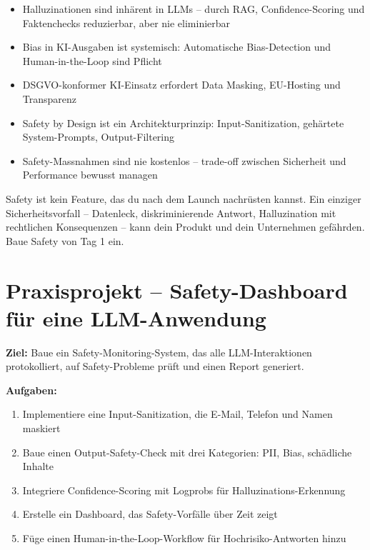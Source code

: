 \begin{zusammenfassung}
\begin{itemize}[leftmargin=*]
    \item Halluzinationen sind inhärent in LLMs -- durch RAG, Confidence-Scoring und Faktenchecks reduzierbar, aber nie eliminierbar
    \item Bias in KI-Ausgaben ist systemisch: Automatische Bias-Detection und Human-in-the-Loop sind Pflicht
    \item DSGVO-konformer KI-Einsatz erfordert Data Masking, EU-Hosting und Transparenz
    \item Safety by Design ist ein Architekturprinzip: Input-Sanitization, gehärtete System-Prompts, Output-Filtering
    \item Safety-Massnahmen sind nie kostenlos -- trade-off zwischen Sicherheit und Performance bewusst managen
\end{itemize}
\end{zusammenfassung}

\begin{merke}
Safety ist kein Feature, das du nach dem Launch nachrüsten kannst. Ein einziger Sicherheitsvorfall -- Datenleck, diskriminierende Antwort, Halluzination mit rechtlichen Konsequenzen -- kann dein Produkt und dein Unternehmen gefährden. Baue Safety von Tag 1 ein.
\end{merke}

\section{Praxisprojekt -- Safety-Dashboard für eine LLM-Anwendung}

\textbf{Ziel:} Baue ein Safety-Monitoring-System, das alle LLM-Interaktionen protokolliert, auf Safety-Probleme prüft und einen Report generiert.

\textbf{Aufgaben:}
\begin{enumerate}[leftmargin=*]
    \item Implementiere eine Input-Sanitization, die E-Mail, Telefon und Namen maskiert
    \item Baue einen Output-Safety-Check mit drei Kategorien: PII, Bias, schädliche Inhalte
    \item Integriere Confidence-Scoring mit Logprobs für Halluzinations-Erkennung
    \item Erstelle ein Dashboard, das Safety-Vorfälle über Zeit zeigt
    \item Füge einen Human-in-the-Loop-Workflow für Hochrisiko-Antworten hinzu
\end{enumerate}

